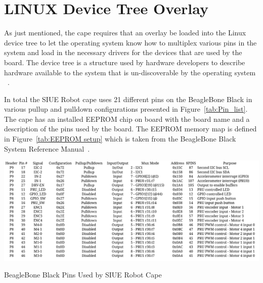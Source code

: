 \documentclass[12pt,oneside,final]{siuethesis}
\theoremstyle{definition}
\begin{document}
\section{LINUX Device Tree Overlay}

As just mentioned, the cape requires that an overlay be loaded into the Linux device tree to let the operating system know how to multiplex various pins in the system and load in the necessary drivers for the devices that are used by the board. The device tree is a structure used by hardware developers to describe hardware available to the system that is un-discoverable by the operating system ~\cite{eLinux-deviceTree}.  

In total the SIUE Robot cape uses 21 different pins on the BeagleBone Black in various pullup and pulldown configurations presented in Figure~\ref{tab:Pin_list}. The cape has an installed EEPROM chip on board with the board name and a description of the pins used by the board. The EEPROM memory map is defined in Figure~\ref{tab:EEPROM setup} which is taken from the BeagleBone Black System Reference Manual~\cite{BBB-SRM}.

\begin{table}[htbp!]
 \centering
 \includegraphics[scale=.3,keepaspectratio=true]{./images/Pinlist.png}
 \caption{BeagleBone Black Pins Used by SIUE Robot Cape}
 \label{tab:Pin_list}
\end{table}
\end{document}
